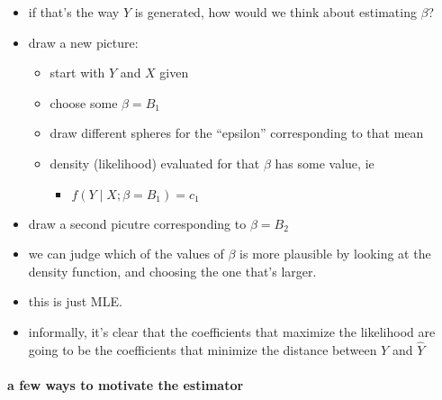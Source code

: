 \begin{itemize}
\item if that's the way $Y$ is generated, how would we think about
        estimating $\beta$?
\item draw a new picture:
\begin{itemize}
\item start with $Y$ and $X$ given
\item choose some $\beta = B_1$
\item draw different spheres for the ``epsilon'' corresponding to that mean
\item density (likelihood) evaluated for that $\beta$ has some value, ie
\begin{itemize}
\item $f(Y \mid X; \beta = B_1) = c_1$
\end{itemize}
\end{itemize}
\item draw a second picutre corresponding to $\beta = B_2$
\item we can judge which of the values of $\beta$ is more plausible by
        looking at the density function, and choosing the one that's larger.
\item this is just MLE.
\item informally, it's clear that the coefficients that maximize the
        likelihood are going to be the coefficients that minimize the
        distance between $Y$ and $\hat Y$
\end{itemize}
\paragraph{a few ways to motivate the estimator}
\label{sec-1-2-3-1}

